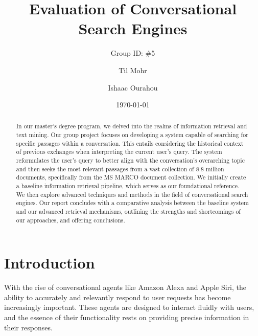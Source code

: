 \documentclass[sigconf]{acmart}
\begin{document}
\title{Evaluation of Conversational Search Engines}
\subtitle{Group ID: \#5}

\author{Til Mohr}
\affiliation{}

\author{Ishaac Ourahou}
\affiliation{}

\date{\today}



\begin{abstract}
In our master's degree program, we delved into the realms of information retrieval and text mining. Our group project focuses on developing a system capable of searching for specific passages within a conversation. This entails considering the historical context of previous exchanges when interpreting the current user's query. The system reformulates the user's query to better align with the conversation's overarching topic and then seeks the most relevant passages from a vast collection of 8.8 million documents, specifically from the MS MARCO document collection. We initially create a baseline information retrieval pipeline, which serves as our foundational reference. We then explore advanced techniques and methods in the field of conversational search engines. Our report concludes with a comparative analysis between the baseline system and our advanced retrieval mechanisms, outlining the strengths and shortcomings of our approaches, and offering conclusions.
\end{abstract}


\renewcommand\footnotetextcopyrightpermission[1]{}
\pagestyle{plain}

\maketitle


\section{Introduction}\label{sec:intro}
With the rise of conversational agents like Amazon Alexa and Apple Siri, the ability to accurately and relevantly respond to user requests has become increasingly important. These agents are designed to interact fluidly with users, and the essence of their functionality rests on providing precise information in their responses.
\end{document}
